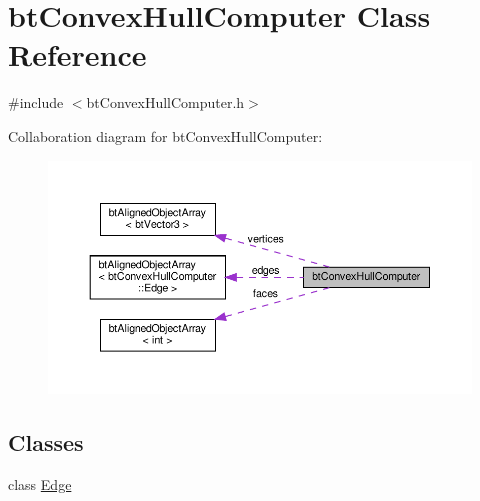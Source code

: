 \hypertarget{classbtConvexHullComputer}{}\section{bt\+Convex\+Hull\+Computer Class Reference}
\label{classbtConvexHullComputer}


{\ttfamily \#include $<$bt\+Convex\+Hull\+Computer.\+h$>$}



Collaboration diagram for bt\+Convex\+Hull\+Computer\+:
\nopagebreak
\begin{figure}[H]
\begin{center}
\leavevmode
\includegraphics[width=350pt]{classbtConvexHullComputer__coll__graph}
\end{center}
\end{figure}
\subsection*{Classes}
\begin{DoxyCompactItemize}
\item 
class \hyperlink{classbtConvexHullComputer_1_1Edge}{Edge}
\end{DoxyCompactItemize}
